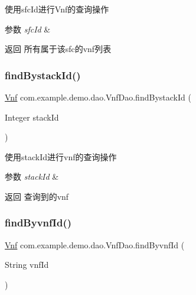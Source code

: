 使用sfc\+Id进行\+Vnf的查询操作 
\begin{DoxyParams}{参数}
{\em sfc\+Id} & \\
\hline
\end{DoxyParams}
\begin{DoxyReturn}{返回}
所有属于该sfc的vnf列表 
\end{DoxyReturn}
\mbox{\label{interfacecom_1_1example_1_1demo_1_1dao_1_1_vnf_dao_a26d9e02b3caede0d520c3922c1c3e869}} 
\subsubsection{\texorpdfstring{find\+Bystack\+Id()}{findBystackId()}}
{\footnotesize\ttfamily \mbox{\hyperlink{classcom_1_1example_1_1demo_1_1modular_1_1_vnf}{Vnf}} com.\+example.\+demo.\+dao.\+Vnf\+Dao.\+find\+Bystack\+Id (\begin{DoxyParamCaption}\item[{Integer}]{stack\+Id }\end{DoxyParamCaption})}

使用stack\+Id进行vnf的查询操作 
\begin{DoxyParams}{参数}
{\em stack\+Id} & \\
\hline
\end{DoxyParams}
\begin{DoxyReturn}{返回}
查询到的vnf 
\end{DoxyReturn}
\mbox{\label{interfacecom_1_1example_1_1demo_1_1dao_1_1_vnf_dao_a9e9c52e14f49ae3d444f707e72404b6e}} 
\subsubsection{\texorpdfstring{find\+Byvnf\+Id()}{findByvnfId()}}
{\footnotesize\ttfamily \mbox{\hyperlink{classcom_1_1example_1_1demo_1_1modular_1_1_vnf}{Vnf}} com.\+example.\+demo.\+dao.\+Vnf\+Dao.\+find\+Byvnf\+Id (\begin{DoxyParamCaption}\item[{String}]{vnf\+Id }\end{DoxyParamCaption})}

